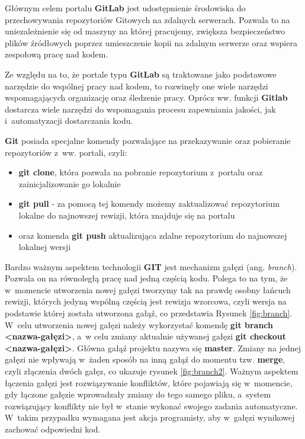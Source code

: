 Głównym celem portalu \textbf{GitLab} jest udostępnienie środowiska do przechowywania repozytoriów Gitowych na zdalnych serwerach. Pozwala to na uniezależnienie się od maszyny na której pracujemy, zwiększa bezpieczeństwo plików źródłowych poprzez umieszczenie kopii na zdalnym serwerze oraz wspiera zespołową pracę nad kodem.\par

Ze względu na to, że portale typu \textbf{GitLab} są traktowane jako podstawowe narzędzie do wspólnej pracy nad kodem, to rozwinęły one wiele narzędzi wspomagających organizację oraz śledzenie pracy. Oprócz ww. funkcji \textbf{Gitlab} dostarcza wiele narzędzi do wspomagania procesu zapewniania jakości, jak i~automatyzacji dostarczania kodu.\par

\textbf{Git} posiada specjalne komendy pozwalające na przekazywanie oraz pobieranie repozytoriów z~ww. portali, czyli:
\begin{itemize}
\item \textbf{git clone}, która pozwala na pobranie repozytorium z~portalu oraz zainicjalizowanie go lokalnie
\item \textbf{git pull} - za pomocą tej komendy możemy zaktualizować repozytorium lokalne do najnowszej rewizji, która znajduje się na portalu
\item oraz komenda \textbf{git push} aktualizująca zdalne repozytorium do najnowszej lokalnej wersji
\end{itemize}

Bardzo ważnym aspektem technologii \textbf{GIT} jest mechanizm gałęzi (ang. \textit{branch}). Pozwala on na równoległą pracę nad jedną częścią kodu. Polega to na tym, że w~momencie utworzenia nowej gałęzi tworzymy tak na prawdę osobny łańcuch rewizji, których jedyną wspólną częścią jest rewizja wzorcowa, czyli wersja na podstawie której została utworzona gałąź, co przedstawia Rysunek \ref{fig:branch}. W~celu utworzenia nowej gałęzi należy wykorzystać komendę \textbf{git branch <nazwa-gałęzi>}, a~w celu zmiany aktualnie używanej gałęzi \textbf{git checkout <nazwa-gałęzi>}. Główna gałąź projektu nazywa się \textbf{master}. Zmiany na jednej gałęzi nie wpływają w~żaden sposób na inną gałąź do momentu tzw. \textbf{merge}, czyli złączenia dwóch gałęz, co ukazuje rysunek \ref{fig:branch2}. Ważnym aspektem łączenia gałęzi jest rozwiązywanie konfliktów, które pojawiają się w~momencie, gdy łączone gałęzie wprowadzały zmiany do tego samego pliku, a~system rozwiązujący konflikty nie był w~stanie wykonać swojego zadania automatyczne. W~takim przypadku wymagana jest akcja programisty, aby w~gałęzi wynikowej zachować odpowiedni kod.

